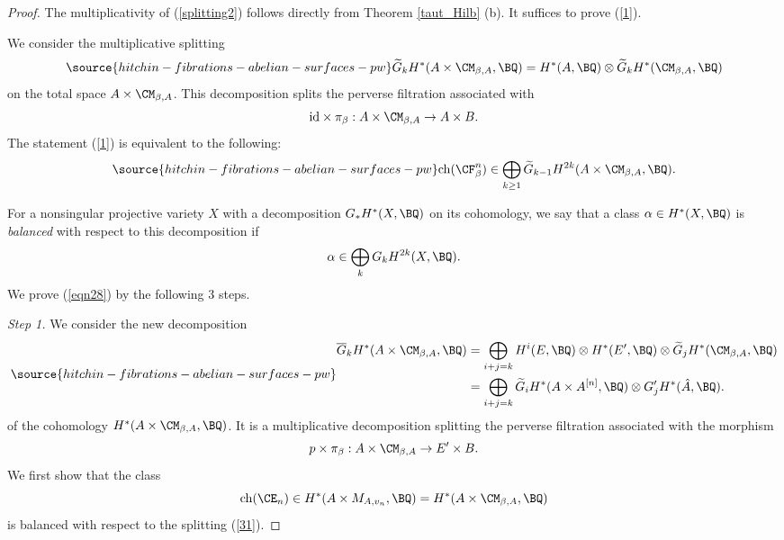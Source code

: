 \begin{proof}
The multiplicativity of (\ref{splitting2}) follows directly from Theorem \ref{taut_Hilb} (b). It suffices to prove (\ref{1}).

We consider the multiplicative splitting
\begin{equation}\label{eqn27}
\source{hitchin-fibrations-abelian-surfaces-pw}
\widetilde{G}_kH^\ast(A \times \CM_{\beta,A} ,\BQ) = H^\ast(A, \BQ) \otimes \widetilde{G}_kH^\ast(\CM_{\beta,A}, \BQ)
\end{equation}
on the total space $A \times \CM_{\beta,A}$. This decomposition splits the perverse filtration associated with
\[
\mathrm{id}\times \pi_\beta: A \times \CM_{\beta, A} \to A \times B.
\]
The statement (\ref{1}) is equivalent to the following:
\begin{equation}\label{eqn28}
\source{hitchin-fibrations-abelian-surfaces-pw}
\mathrm{ch}(\CF^n_\beta) \in \bigoplus_{k\geq 1} \widetilde{G}_{k-1} H^{2k}(A\times \CM_{\beta, A}, \BQ).
\end{equation}

For a nonsingular projective variety $X$ with a decomposition $G_*H^*(X, \BQ)$ on its cohomology, we say that a class $\alpha \in H^*(X, \BQ)$ is \emph{balanced} with respect to this decomposition if
\[
\alpha \in \bigoplus_{k} G_{k} H^{2k}(X, \BQ).
\]
We prove (\ref{eqn28}) by the following 3 steps.

\emph{Step 1.} We consider the new decomposition
\begin{equation}\label{31}
\source{hitchin-fibrations-abelian-surfaces-pw}
\begin{split}
\overline{G}_k H^*(A \times \CM_{\beta, A}, \BQ)& = \bigoplus_{i+j=k} H^i(E, \BQ) \otimes H^*(E', \BQ) \otimes \widetilde{G}_jH^*(\CM_{\beta,A}, \BQ)\\
& = \bigoplus_{i+j=k} \widetilde{G}_i H^\ast(A \times A^{[n]}, \BQ) \otimes G'_jH^\ast(\hat{A}, \BQ).
\end{split}
\end{equation}
of the cohomology $H^\ast(A\times \CM_{\beta,A}, \BQ)$. It is a multiplicative decomposition splitting the perverse filtration associated with the morphism
\[
p \times \pi_\beta: A\times \CM_{\beta,A} \to E' \times B.
\]
We first show that the class
\[
\mathrm{ch}(\CE_n) \in H^\ast(A \times M_{A, v_n}, \BQ) = H^*(A \times \CM_{\beta,A}, \BQ)
\]
is balanced with respect to the splitting (\ref{31}).



\end{proof}
